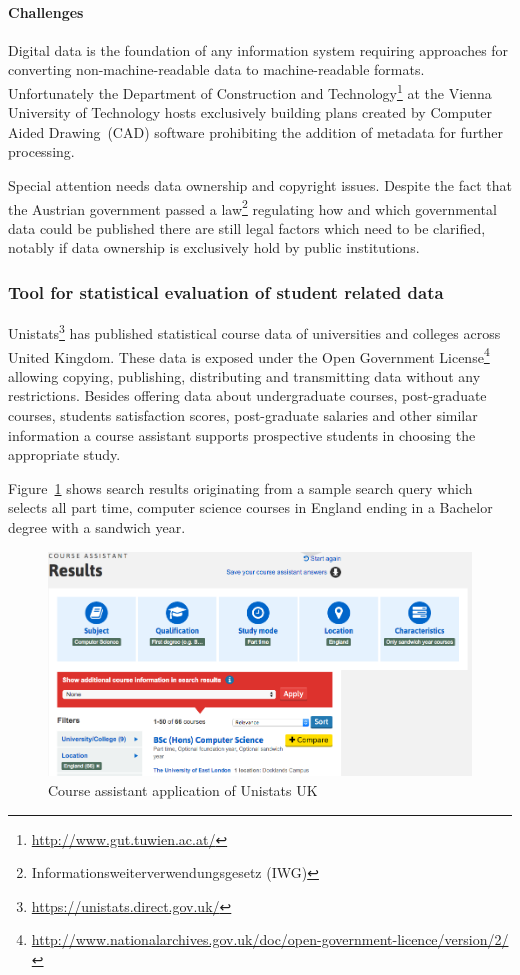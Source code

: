 \documentclass{article}
\begin{document}
\paragraph{Challenges}
Digital data is the foundation of any information system requiring approaches for converting non-machine-readable data to machine-readable formats. Unfortunately the Department of Construction and Technology\footnote{\url{http://www.gut.tuwien.ac.at/}} at the Vienna University of Technology hosts exclusively building plans created by Computer Aided Drawing~(CAD) software prohibiting the addition of metadata for further processing. 

Special attention needs data ownership and copyright issues. Despite the fact that the Austrian government passed a law\footnote{Informationsweiterverwendungsgesetz (IWG)} regulating how and which governmental data could be published there are still legal factors which need to be clarified, notably if data ownership is exclusively hold by public institutions. 
\subsubsection{Tool for statistical evaluation of student related data}
Unistats\footnote{\url{https://unistats.direct.gov.uk/}} has published statistical course data of universities and colleges across United Kingdom. These data is exposed under the Open Government License\footnote{\url{http://www.nationalarchives.gov.uk/doc/open-government-licence/version/2/}} allowing copying, publishing, distributing and transmitting data without any restrictions. Besides offering data about undergraduate courses, post-graduate courses, students satisfaction scores, post-graduate salaries and other similar information a course assistant supports prospective students in choosing the appropriate study. 

Figure~\ref{fig:unistats-uk} shows search results originating from a sample search query which selects all part time, computer science courses in England ending in a Bachelor degree with a sandwich year. 
\begin{figure}[H]
	\centering \includegraphics*[width=.8\columnwidth]{unistats_uk.png}
	\caption{Course assistant application of Unistats UK}
	\label{fig:unistats-uk}
\end{figure}
\end{document}
